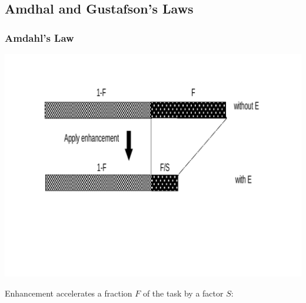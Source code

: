\documentclass{beamer}
\begin{document}
\subsection{Amdhal and Gustafson's Laws}

\begin{frame}[fragile,t]
\frametitle{Amdahl's Law}
\vspace{-5ex}
\includegraphics[width=47ex]{Ch1Figs/Amdhal}
\vspace{-7ex}

Enhancement accelerates a fraction $F$ of the task by a factor $S$:\bigskip

\bigskip


\end{frame}
\end{document}
